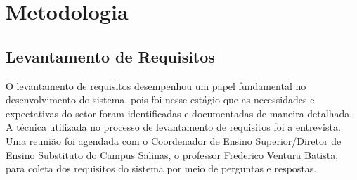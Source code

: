 \chapter{Metodologia} 
\label{cap4_metodologia}

\section{Levantamento de Requisitos}

O levantamento de requisitos desempenhou um papel fundamental no desenvolvimento do sistema, pois foi nesse estágio que as necessidades e expectativas do setor foram identificadas e documentadas de maneira detalhada. A técnica utilizada no processo de levantamento de requisitos foi a entrevista. Uma reunião foi agendada com o Coordenador de Ensino Superior/Diretor de Ensino Substituto do Campus Salinas, o professor Frederico Ventura Batista, para coleta dos requisitos do sistema por meio de perguntas e respostas.

